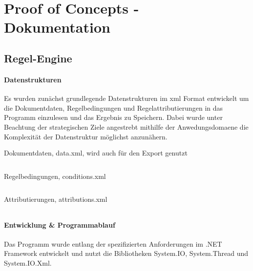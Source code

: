 \documentclass[11pt,oneside,a4paper,notitlepage]{article}
\begin{document}
%
\section{Proof of Concepts - Dokumentation}
%
\subsection{Regel-Engine}

\paragraph*{Datenstrukturen}
Es wurden zunächst grundlegende Datenstrukturen im xml Format entwickelt um die Dokumentdaten, Regelbedingungen und Regelattributierungen in das Programm einzulesen und das Ergebnis zu Speichern. Dabei wurde unter Beachtung der strategischen Ziele angestrebt mithilfe der Anwedungsdomaene die Komplexität der Datenstruktur möglichst anzunähern.

Dokumentdaten, data.xml, wird auch für den Export genutzt\\
\begin{verbatim}

\end{verbatim}

Regelbedingungen, conditions.xml
\begin{verbatim}

\end{verbatim}

Attributierungen, attributions.xml
\begin{verbatim}

\end{verbatim}

\paragraph*{Entwicklung \& Programmablauf}
Das Programm wurde entlang der spezifizierten Anforderungen im .NET Framework entwickelt und nutzt die Bibliotheken System.IO, System.Thread und System.IO.Xml. 
\end{document}
